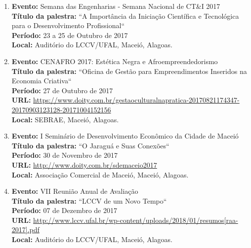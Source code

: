 \documentclass[a4paper,oneside,10pt]{article}
\begin{document}
\begin{enumerate}
 \newpage        
 \item   \textbf{Evento:} Semana das Engenharias - Semana Nacional de CT\&I 2017
  \mbox{} \\
         \textbf{Título da palestra:}  ``A Importância da Iniciação Científica e Tecnológica para o Desenvolvimento Profissional``\\
        \textbf{Período:} 23 a 25 de Outubro de 2017\\
        \textbf{Local:} Auditório do LCCV/UFAL, Maceió, Alagoas. 

\item   \textbf{Evento:} CENAFRO 2017: Estética Negra e Afroempreendedorismo
  \mbox{} \\
       \textbf{Título da palestra:}  ``Oficina de Gestão para Empreendimentos Inseridos na Economia Criativa``\\
        \textbf{Período:} 27 de Outubro de 2017\\
        \textbf{URL:} \url{https://www.doity.com.br/gestaoculturalnapratica-20170821174347-20170903123128-20171004152156}\\
        \textbf{Local:} SEBRAE, Maceió, Alagoas.  
        
  \item   \textbf{Evento:} I Seminário de Desenvolvimento Econômico da Cidade de Maceió
  \mbox{} \\
         \textbf{Título da palestra:}  ``O Jaraguá e Suas Conexões``\\
        \textbf{Período:} 30 de Novembro de 2017\\
        \textbf{URL:} \url{http://www.doity.com.br/sdemaceio2017}\\
        \textbf{Local:} Associação Comercial de Maceió, Maceió, Alagoas.    
     
  \item   \textbf{Evento:} VII Reunião Anual de Avaliação  
  \mbox{} \\
         \textbf{Título da palestra:}  ``LCCV de um Novo Tempo``\\
        \textbf{Período:} 07 de Dezembro de 2017\\
        \textbf{URL:} \url{http://www.lccv.ufal.br/wp-content/uploads/2018/01/resumos[raa-2017].pdf}\\
        \textbf{Local:} Auditório do LCCV/UFAL, Maceió, Alagoas.  
                
\end{enumerate}
\end{document}
